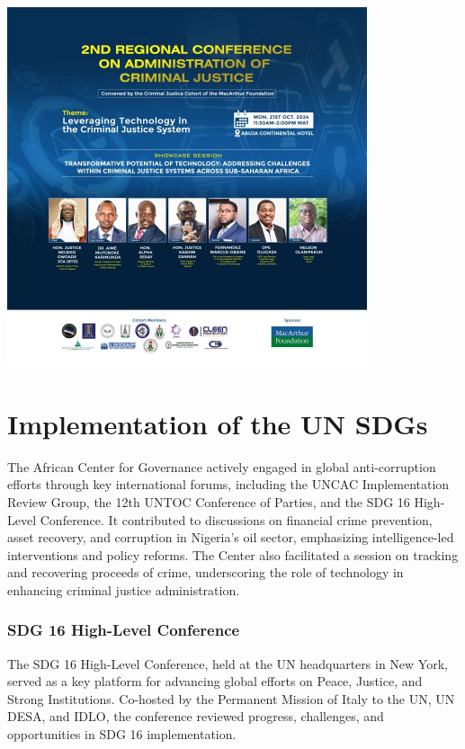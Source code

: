 \documentclass[
  letterpaper,
  DIV=11,
  numbers=noendperiod]{scrreprt}
\begin{document}
\begin{center}
\includegraphics[width=4.16667in,height=\textheight,keepaspectratio]{images/return/08_facil.png}
\end{center}

\chapter{Implementation of the UN
SDGs}\label{implementation-of-the-un-sdgs}

The African Center for Governance actively engaged in global
anti-corruption efforts through key international forums, including the
UNCAC Implementation Review Group, the 12th UNTOC Conference of Parties,
and the SDG 16 High-Level Conference. It contributed to discussions on
financial crime prevention, asset recovery, and corruption in Nigeria's
oil sector, emphasizing intelligence-led interventions and policy
reforms. The Center also facilitated a session on tracking and
recovering proceeds of crime, underscoring the role of technology in
enhancing criminal justice administration.

\subsection{SDG 16 High-Level
Conference}\label{sdg-16-high-level-conference}

The SDG 16 High-Level Conference, held at the UN headquarters in New
York, served as a key platform for advancing global efforts on Peace,
Justice, and Strong Institutions. Co-hosted by the Permanent Mission of
Italy to the UN, UN DESA, and IDLO, the conference reviewed progress,
challenges, and opportunities in SDG 16 implementation.
\end{document}
